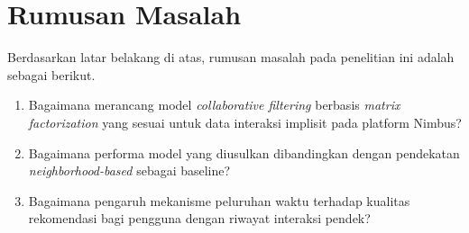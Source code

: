 \section{Rumusan Masalah}
Berdasarkan latar belakang di atas, rumusan masalah pada penelitian ini
adalah sebagai berikut.
\begin{enumerate}
  \item Bagaimana merancang model \emph{collaborative filtering} berbasis
    \emph{matrix factorization} yang sesuai untuk data interaksi implisit
    pada platform Nimbus?
  \item Bagaimana performa model yang diusulkan dibandingkan dengan
    pendekatan \emph{neighborhood-based} sebagai baseline?
  \item Bagaimana pengaruh mekanisme peluruhan waktu terhadap kualitas
    rekomendasi bagi pengguna dengan riwayat interaksi pendek?
\end{enumerate}

